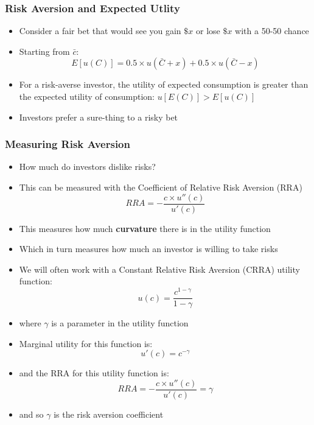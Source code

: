 \documentclass[a4paper,twoside]{article}
\newif\IfInSansMode
\numberwithin{equation}{section}
\numberwithin{figure}{section}
\begin{document}
\subsubsection{Risk Aversion and Expected Utlity}
	\begin{itemize}
		\item Consider a fair bet that would see you gain \( \$x \) or lose \( \$x \) with a 50-50 chance
		\item Starting from \( \bar{c} \):
		\[
			E[u(C)] = 0.5 \times u(\bar{C}+x) + 0.5 \times u(\bar{C}-x)
		\]
		\item For a risk-averse investor, the utility of expected consumption is greater than the expected utility of consumption: \( u[E(C)] > E[u(C)] \)
		\item \textcolor{myblue}{Investors prefer a sure-thing to a risky bet}
	\end{itemize}
\subsubsection{Measuring Risk Aversion}
	\begin{itemize}
		\item How much do investors dislike risks?
		\item This can be measured with the \textcolor{myblue}{Coefficient of Relative Risk Aversion} (RRA)
		\[
			RRA = -\frac{c \times u''(c)}{u'(c)}
		\]
		\item This measures how much \textbf{curvature} there is in the utility function
		\item Which in turn measures how much an investor is willing to take risks
		\item We will often work with a \textcolor{myblue}{Constant Relative Risk Aversion} (CRRA) utility function:
		\[
			u(c) = \frac{c^{1-\gamma}}{1-\gamma}
		\]
		\item where \( \gamma \) is a parameter in the utility function
		\item Marginal utility for this function is:
		\[
			u'(c)=c^{-\gamma}
		\]
		\item and the RRA for this utility function is:
		\[
			RRA = -\frac{c \times u''(c)}{u'(c)} = \gamma
		\]
		\item and so \( \gamma \) is the risk aversion coefficient
	\end{itemize}
\end{document}
